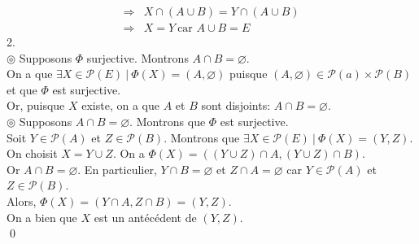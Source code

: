 \documentclass[10pt]{article}
\begin{document}
\begin{tcolorbox}[enhanced, width=7.6in, center, size=fbox, fontupper=\large, drop shadow southwest]
\begin{align*}
        \Longrightarrow& X \cap (A \cup B) = Y \cap (A \cup B)\\
        \Longrightarrow& X = Y ~ \text{car } A \cup B = E 
    \end{align*}
    2.\\
    $\circledcirc$ Supposons $\varPhi$ surjective. Montrons $A \cap B = \varnothing$.\\
    On a que $\exists X \in \mathcal{P}(E) ~ | ~ \varPhi(X) = (A, \varnothing)$ puisque $(A, \varnothing) \in \mathcal{P}(a) \times \mathcal{P}(B)$ et que $\varPhi$ est surjective.\\
    Or, puisque $X$ existe, on a que $A$ et $B$ sont disjoints:  $A \cap B = \varnothing$.\\[0.1cm]
    $\circledcirc$ Supposons $A \cap B = \varnothing$. Montrons que $\varPhi$ est surjective.\\
    Soit $Y \in \mathcal{P}(A)$ et $Z \in \mathcal{P}(B)$. Montrons que $\exists X \in \mathcal{P}(E) ~ | ~ \varPhi(X) = (Y, Z)$.\\
    On choisit $X = Y \cup Z$. On a $\varPhi(X)=((Y \cup Z) \cap A, (Y \cup Z) \cap B)$.\\
    Or $A \cap B = \varnothing$. En particulier, $Y \cap B = \varnothing$ et $Z\cap A = \varnothing$ car $Y\in\mathcal{P}(A)$ et $Z \in \mathcal{P}(B)$.\\
    Alors, $\varPhi(X)=(Y \cap A, Z \cap B)=(Y,Z)$.\\
    On a bien que $X$ est un antécédent de $(Y,Z)$.\\
    \qed
\end{tcolorbox}
\end{document}
